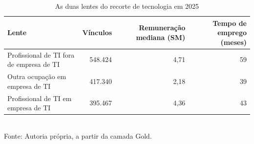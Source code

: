 \begin{table}[htbp]
    \centering
    \caption{As duas lentes do recorte de tecnologia em 2025}
    \label{tab:lentes}
    \footnotesize
    \renewcommand{\arraystretch}{1.25}
    \begin{tabular}{lrrr}
        \toprule
        \rowcolor{black!8}
        \textbf{Lente} & \textbf{Vínculos} & \textbf{Remuneração mediana (SM)} & \textbf{Tempo de emprego (meses)} \\
        \midrule
        Profissional de TI fora de empresa de TI & 548.424 & 4,71 & 59 \\
        Outra ocupação em empresa de TI & 417.340 & 2,18 & 39 \\
        Profissional de TI em empresa de TI & 395.467 & 4,36 & 43 \\
        \bottomrule
    \end{tabular}
    \\[4pt]
    Fonte: Autoria própria, a partir da camada Gold.
\end{table}
